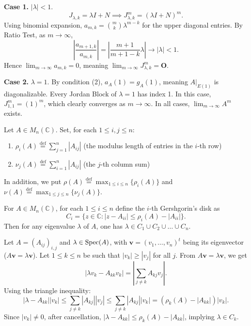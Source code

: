 \begin{pfbox}
\textbf{Case 1.} $|\lambda|<1$.
\[
J_{\lambda,k}
=
\lambda I+N
\implies
J_{\lambda,k}^m
=
(\lambda I+N)^m.
\]
Using binomial expansion, $a_{m,k}=\binom{m}{k}\lambda^{m-k}$ for the upper diagonal entries.
By Ratio Test, as $m\to\infty$,
\[
\left|\frac{a_{m+1,k}}{a_{m,k}}\right|
=
\left|\frac{m+1}{m+1-k}\lambda\right|
\to
|\lambda|<1.
\]
Hence $\displaystyle\lim_{m\to\infty} a_{m,k}=0$, meaning $\displaystyle\lim_{m\to\infty} J_{\lambda,k}^m=\mathbf{O}$.

\textbf{Case 2.} $\lambda=1$.
By condition (2), $a_A(1)=g_A(1)$, meaning $A|_{E(1)}$ is diagonalizable.
Every Jordan Block of $\lambda=1$ has index 1.
In this case, $J_{1,1}^m=(1)^m$, which clearly converges as $m\to\infty$.
In all cases, $\displaystyle\lim_{m\to\infty} A^m$ exists.
\end{pfbox}


\begin{definition}
Let $A\in M_n(\mathbb{C})$. Set, for each $1\le i,j\le n$:
\begin{enumerate}
    \item $\rho_i(A)\overset{\mathrm{def}}{=} \displaystyle\sum_{j=1}^n |A_{ij}|$ (the modulus length of entries in the $i$-th row)
    \item $\nu_j(A)\overset{\mathrm{def}}{=} \displaystyle\sum_{i=1}^n |A_{ij}|$ (the $j$-th column sum)
\end{enumerate}
In addition, we put $\rho(A)\overset{\mathrm{def}}{=} \displaystyle\max_{1\le i\le n}\{\rho_i(A)\}$ and $\nu(A)\overset{\mathrm{def}}{=} \displaystyle\max_{1\le j\le n}\{\nu_j(A)\}$.
\end{definition}

\begin{theorem}
For $A\in M_n(\mathbb{C})$, for each $1\le i\le n$ define the $i$-th Gershgorin's disk as
\[
C_i
=
\{z\in\mathbb{C}: |z-A_{ii}|\le \rho_i(A)-|A_{ii}|\}.
\]
Then for any eigenvalue $\lambda$ of $A$, one has $\lambda\in C_1\cup C_2\cup\dots\cup C_n$.
\end{theorem}

\begin{pfbox}
Let $A=(A_{ij})_{i,j}$ and $\lambda\in\operatorname{Spec}(A)$, with $\mathbf{v}=(v_1,\dots,v_n)^t$ being its eigenvector ($A\mathbf{v}=\lambda\mathbf{v}$).
Let $1\le k\le n$ be such that $|v_k|\ge |v_j|$ for all $j$.
From $A\mathbf{v}=\lambda\mathbf{v}$, we get
\[
|\lambda v_k-A_{kk}v_k|
=
\left|\sum_{j\neq k} A_{kj}v_j\right|.
\]
Using the triangle inequality:
\[
|\lambda-A_{kk}| |v_k|
\le
\sum_{j\neq k} |A_{kj}| |v_j|
\le
\sum_{j\neq k} |A_{kj}| |v_k|
=
(\rho_k(A)-|A_{kk}|)|v_k|.
\]
Since $|v_k|\neq 0$, after cancellation, $|\lambda-A_{kk}|\le \rho_k(A)-|A_{kk}|$, implying $\lambda\in C_k$.
\end{pfbox}


